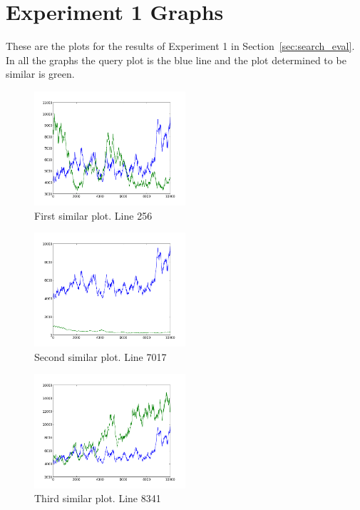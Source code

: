 \clearpage

\section{Experiment 1 Graphs}
\label{sec:experiment1}

These are the plots for the results of Experiment 1 in Section~\ref{sec:search_eval}.  In all the graphs the query plot is the blue line and the plot determined to be similar is green.

\begin{figure}[h!]
    \centering
    \includegraphics[width=0.5\textwidth]{images/256.png}
    \caption{First similar plot.  Line 256}
    \label{fig:ex1_1}
\end{figure}

\begin{figure}[h!]
    \centering
    \includegraphics[width=0.5\textwidth]{images/7017.png}
    \caption{Second similar plot.  Line 7017}
    \label{fig:ex1_2}
\end{figure}

\begin{figure}[h!]
    \centering
    \includegraphics[width=0.5\textwidth]{images/8341.png}
    \caption{Third similar plot.  Line 8341}
    \label{fig:ex1_3}
\end{figure}

